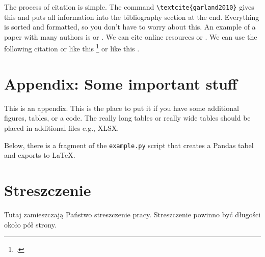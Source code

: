 \documentclass[english, twoside, 12pt, a4paper]{article}
\makeatletter
\theoremstyle{definition}
\theoremstyle{plain}
\theoremstyle{remark}
\renewcommand\footnotesize{%
   \@setfontsize\footnotesize\@ixpt{10}%
   \abovedisplayskip 8\p@ \@plus2\p@ \@minus4\p@
   \abovedisplayshortskip \z@ \@plus\p@
   \belowdisplayshortskip 4\p@ \@plus2\p@ \@minus2\p@
   \def\@listi{\leftmargin\leftmargini
               \topsep 4\p@ \@plus2\p@ \@minus2\p@
               \parsep 2\p@ \@plus\p@ \@minus\p@
               \itemsep \parsep}%
   \belowdisplayskip \abovedisplayskip
}
\newcommand{\code}[1]{\lstinline{#1}}
\makeatother
\begin{document}
The process of citation is simple. The command  \verb+\textcite{garland2010}+ gives this \textcite{garland2010} and puts all information into the bibliography section at the end. Everything is sorted and formatted, so you don't have to worry about this. An example of a paper with many authors is \cite{benaim2003} or \cite{osborne1998}. We can cite online resources \cite{bbb} or \cite{cnn}. We can use the following citation \parencite{benaim2003} or like this \footcite{benaim2003} or like this .

\appendix

\clearpage
\section{Appendix: Some important stuff}

This is an appendix. This is the place to put it if you have some additional figures, tables, or a code. The really long tables or really wide tables should be placed in additional files e.g., XLSX. 



Below, there is a fragment of the \code{example.py} script that creates a Pandas tabel and exports to \LaTeX{}.



\clearpage
\printbibliography[heading=subbibliography,nottype=online,title={References}]
\printbibliography[heading=subbibliography,type=online,title={Online references}]


\clearpage
{}
\listoftables

\clearpage
{}
\listoffigures



\clearpage
{}
\section*{Streszczenie}

Tutaj zamieszczają Państwo streszczenie pracy. Streszczenie powinno być długości około pół strony.
\end{document}

